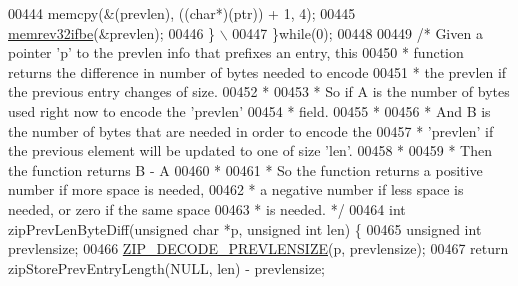 \begin{DoxyCode}
{{00444         \textcolor{preprocessor}{memcpy}\textcolor{preprocessor}{(}\textcolor{preprocessor}{&}\textcolor{preprocessor}{(}\textcolor{preprocessor}{prevlen}\textcolor{preprocessor}{)}\textcolor{preprocessor}{,} \textcolor{preprocessor}{(}\textcolor{preprocessor}{(}\textcolor{keywordtype}{char}\textcolor{preprocessor}{*}\textcolor{preprocessor}{)}\textcolor{preprocessor}{(}\textcolor{preprocessor}{ptr}\textcolor{preprocessor}{)}\textcolor{preprocessor}{)} \textcolor{preprocessor}{+} 1\textcolor{preprocessor}{,} 4\textcolor{preprocessor}{)}\textcolor{preprocessor}{;}
00445         \hyperlink{endianconv_8h_a771f3656eb7d11a1e7f7294b657d8978}{memrev32ifbe}\textcolor{preprocessor}{(}\textcolor{preprocessor}{&}\textcolor{preprocessor}{prevlen}\textcolor{preprocessor}{)}\textcolor{preprocessor}{;}
00446     \textcolor{preprocessor}{\}}                                                                          \textcolor{preprocessor}{\(\backslash\)}
00447 \textcolor{preprocessor}{\}}\textcolor{keywordflow}{while}\textcolor{preprocessor}{(}0\textcolor{preprocessor}{)}\textcolor{preprocessor}{;}
00448 
00449 \textcolor{comment}{/* Given a pointer 'p' to the prevlen info that prefixes an entry, this}
00450 \textcolor{comment}{ * function returns the difference in number of bytes needed to encode}
00451 \textcolor{comment}{ * the prevlen if the previous entry changes of size.}
00452 \textcolor{comment}{ *}
00453 \textcolor{comment}{ * So if A is the number of bytes used right now to encode the 'prevlen'}
00454 \textcolor{comment}{ * field.}
00455 \textcolor{comment}{ *}
00456 \textcolor{comment}{ * And B is the number of bytes that are needed in order to encode the}
00457 \textcolor{comment}{ * 'prevlen' if the previous element will be updated to one of size 'len'.}
00458 \textcolor{comment}{ *}
00459 \textcolor{comment}{ * Then the function returns B - A}
00460 \textcolor{comment}{ *}
00461 \textcolor{comment}{ * So the function returns a positive number if more space is needed,}
00462 \textcolor{comment}{ * a negative number if less space is needed, or zero if the same space}
00463 \textcolor{comment}{ * is needed. */}
00464 \textcolor{keywordtype}{int} zipPrevLenByteDiff(\textcolor{keywordtype}{unsigned} \textcolor{keywordtype}{char} *p, \textcolor{keywordtype}{unsigned} \textcolor{keywordtype}{int} len) \{
00465     \textcolor{keywordtype}{unsigned} \textcolor{keywordtype}{int} prevlensize;
00466     \hyperlink{ziplist_8c_a0bae94c4c67cbd6a27ea3e2f17fb0210}{ZIP\_DECODE\_PREVLENSIZE}(p, prevlensize);
00467     \textcolor{keywordflow}{return} zipStorePrevEntryLength(NULL, len) - prevlensize;
}}
\end{DoxyCode}
